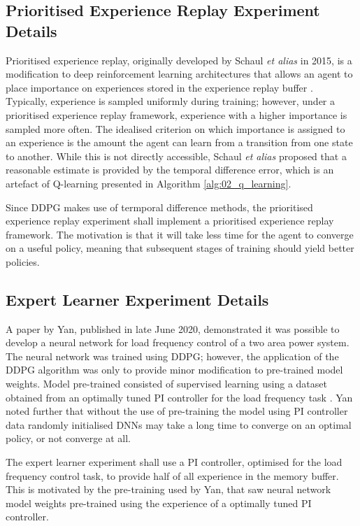 \subsection{Prioritised Experience Replay Experiment Details}\label{sec:per_approach}
Prioritised experience replay, originally developed by Schaul \textit{et alias} in 2015, is a modification to deep reinforcement learning architectures that allows an agent to place importance on experiences stored in the experience replay buffer \cite{Schaul2015}. Typically, experience is sampled uniformly during training; however, under a prioritised experience replay framework, experience with a higher importance is sampled more often. The idealised criterion on which importance is assigned to an experience is the amount the agent can learn from a transition from one state to another. While this is not directly accessible, Schaul \textit{et alias} proposed that a reasonable estimate is provided by the temporal difference error, which is an artefact of Q-learning presented in Algorithm \ref{alg:02_q_learning}.

Since DDPG makes use of termporal difference methods, the prioritised experience replay experiment shall implement a prioritised experience replay framework. The motivation is that it will take less time for the agent to converge on a useful policy, meaning that subsequent stages of training should yield better policies.

\subsection{Expert Learner Experiment Details}\label{sec:expert_learner_approach}
A paper by Yan, published in late June 2020, demonstrated it was possible to develop a neural network for load frequency control of a two area power system. The neural network was trained using DDPG; however, the application of the DDPG algorithm was only to provide minor modification to pre-trained model weights. Model pre-trained consisted of supervised learning using a dataset obtained from an optimally tuned PI controller for the load frequency task \cite{Yan2020}. Yan noted further that without the use of pre-training the model using PI controller data randomly initialised DNNs may take a long time to converge on an optimal policy, or not converge at all.

The expert learner experiment shall use a PI controller, optimised for the load frequency control task, to provide half of all experience in the memory buffer. This is motivated by the pre-training used by Yan, that saw neural network model weights pre-trained using the experience of a optimally tuned PI controller.

